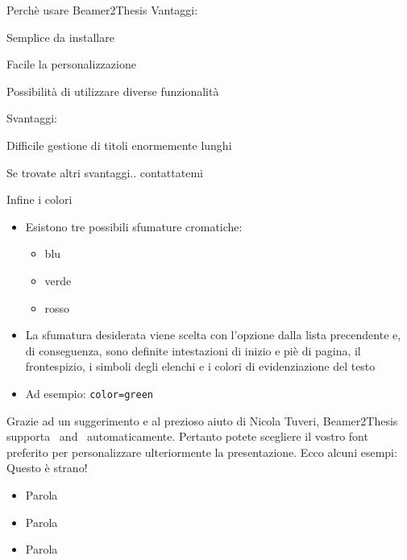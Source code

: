 \begin{tframe}{Perchè usare Beamer2Thesis}
Vantaggi:
\begin{adv}
\item Semplice da installare
\item Facile la personalizzazione
\item Possibilità di utilizzare diverse funzionalità
\end{adv}
Svantaggi:
\begin{disadv}
\item Difficile gestione di titoli enormemente lunghi
\item Se trovate altri svantaggi.. contattatemi
\end{disadv}
\end{tframe}

\begin{frame}[t,fragile]{Infine i colori}
\begin{itemize}
\item Esistono tre possibili sfumature cromatiche:
\begin{itemize}
\item blu
\item verde
\item rosso
\end{itemize}
\item La sfumatura desiderata viene scelta con l'opzione  dalla lista precendente e, di conseguenza, sono definite intestazioni di inizio e piè di pagina, il frontespizio, i simboli degli elenchi e i colori di evidenziazione del testo
\item Ad esempio: \verb!color=green!
\end{itemize}
\end{frame}

\begin{tframe}{\XeLaTeX}
Grazie ad un suggerimento e al prezioso aiuto di Nicola Tuveri, Beamer2Thesis supporta \XeTeX\, and \XeLaTeX\, automaticamente.
Pertanto potete scegliere il vostro font preferito per personalizzare ulteriormente la presentazione. Ecco alcuni esempi:\\
\fontsize{12pt}{18pt}\selectfont Questo è strano! 
\selectfont{Anche questo è strano}\\
\selectfont{Come personalizzare i font?}\par
\begin{itemize}
\item {\LARGE Parola}
\item Parola
\item {\tiny Parola}
\end{itemize}
\end{tframe}

